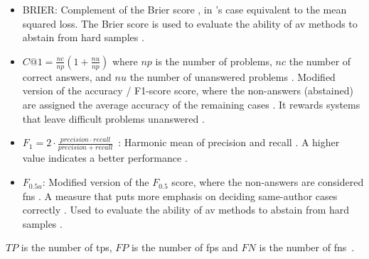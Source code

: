 \begin{itemize}
    \item BRIER: Complement of the Brier score \citep{bevendorff_overview_2024,weerasinghe_feature_vector_difference_2021}, 
    in \citet{bevendorff_overview_2024}'s case equivalent to the mean squared loss.
    The Brier score is used to evaluate the ability of \ac{av} methods to abstain from hard samples \citep{tyo_state_2022}.
    
    \item $C@1 = \frac{nc}{np}(1+\frac{nu}{np})$ where $np$ is the number of problems, $nc$ the number of correct answers, 
    and $nu$ the number of unanswered problems \citep{kocher_unine_2015}. 
    Modified version of the accuracy \citep{bevendorff_overview_2024}/ F1-score \citep{weerasinghe_feature_vector_difference_2021} score, 
    where the non-answers (abstained) \citep{llm_detection_av_2025} are assigned the average accuracy of the remaining cases \citep{bevendorff_overview_2024}. 
    It rewards systems that leave difficult problems unanswered \citep{weerasinghe_feature_vector_difference_2021}.
    
    \item $F_1 = 2 \cdot \frac{precision \cdot recall}{precision + recall}$~\citep{neal_surveying_2018}: Harmonic mean of precision and recall \citep{bevendorff_overview_2024,weerasinghe_feature_vector_difference_2021}.
    A higher value indicates a better performance \citep{neal_surveying_2018}.
    
    \item $F_{0.5u}$: Modified version of the $F_{0.5}$ score, where the non-answers are considered \acp{fn} \citep{bevendorff_overview_2024}. 
    A measure that puts more emphasis on deciding same-author cases correctly \citep{weerasinghe_feature_vector_difference_2021}.
    Used to evaluate the ability of \ac{av} methods to abstain from hard samples \citep{tyo_state_2022}.
\end{itemize}
$TP$ is the number of \aclp{tp}, $FP$ is the number of \aclp{fp} 
and $FN$ is the number of \aclp{fn}~\citep{chen_web_2008}.




